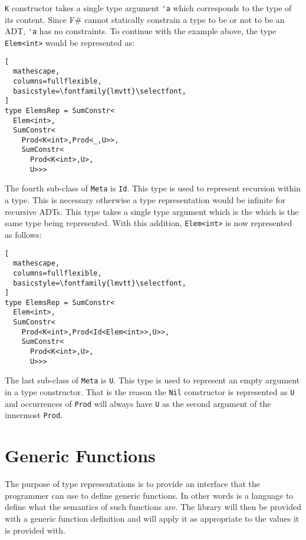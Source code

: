 \documentclass{sigplanconf}
\begin{document}
\verb+K+ constructor takes a single type argument \verb+'a+ which
corresponds to the type of its content. Since F\# cannot statically
constrain a type to be or not to be an ADT, \verb+'a+ has no
constraints. To continue with the example above, the type
\verb+Elem<int>+ would be represented as:
\begin{lstlisting}[
  mathescape,
  columns=fullflexible,
  basicstyle=\fontfamily{lmvtt}\selectfont,
]
type ElemsRep = SumConstr<
  Elem<int>,
  SumConstr<
    Prod<K<int>,Prod<_,U>>,
    SumConstr<
      Prod<K<int>,U>,
      U>>>
\end{lstlisting}
The fourth sub-class of \verb+Meta+ is \verb+Id+. This type is used to
represent recursion within a type. This is necessary otherwise a type
representation would be infinite for recursive ADTs. This type takes a
single type argument which is the which is the same type being
represented. With this addition, \verb+Elem<int>+ is now represented
as follows:
\begin{lstlisting}[
  mathescape,
  columns=fullflexible,
  basicstyle=\fontfamily{lmvtt}\selectfont,
]
type ElemsRep = SumConstr<
  Elem<int>,
  SumConstr<
    Prod<K<int>,Prod<Id<Elem<int>>,U>>,
    SumConstr<
      Prod<K<int>,U>,
      U>>>
\end{lstlisting}
The last sub-class of \verb+Meta+ is \verb+U+. This type is used to
represent an empty argument in a type constructor. That is the reason
the \verb+Nil+ constructor is represented as \verb+U+ and occurrences
of \verb+Prod+ will always have \verb+U+ as the second argument of the
innermost \verb+Prod+.
\section{Generic Functions}
The purpose of type representations is to provide an interface that
the programmer can use to define generic functions. In other words is
a language to define what the semantics of such functions are. The
library will then be provided with a generic function definition and
will apply it as appropriate to the values it is provided with.
\end{document}
